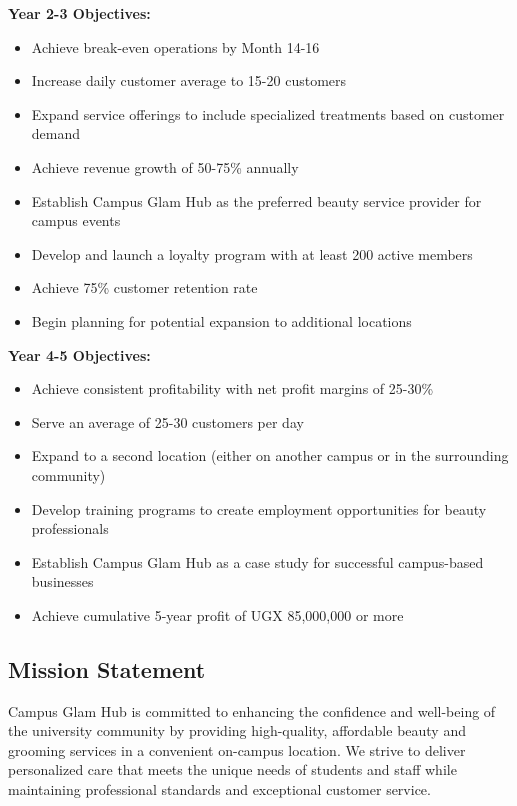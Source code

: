 \documentclass[a4paper,12pt]{article}
\begin{document}
\textbf{Year 2-3 Objectives:}
\begin{itemize}[leftmargin=2em]
    \item Achieve break-even operations by Month 14-16
    \item Increase daily customer average to 15-20 customers
    \item Expand service offerings to include specialized treatments based on customer demand
    \item Achieve revenue growth of 50-75\% annually
    \item Establish Campus Glam Hub as the preferred beauty service provider for campus events
    \item Develop and launch a loyalty program with at least 200 active members
    \item Achieve 75\% customer retention rate
    \item Begin planning for potential expansion to additional locations
\end{itemize}

\textbf{Year 4-5 Objectives:}
\begin{itemize}[leftmargin=2em]
    \item Achieve consistent profitability with net profit margins of 25-30\%
    \item Serve an average of 25-30 customers per day
    \item Expand to a second location (either on another campus or in the surrounding community)
    \item Develop training programs to create employment opportunities for beauty professionals
    \item Establish Campus Glam Hub as a case study for successful campus-based businesses
    \item Achieve cumulative 5-year profit of UGX 85,000,000 or more
\end{itemize}

\subsection{Mission Statement}

Campus Glam Hub is committed to enhancing the confidence and well-being of the university community by providing high-quality, affordable beauty and grooming services in a convenient on-campus location. We strive to deliver personalized care that meets the unique needs of students and staff while maintaining professional standards and exceptional customer service.
\end{document}

